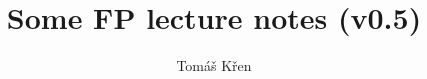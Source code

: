 \documentclass[a4paper,oneside]{memoir}
\title{Some FP lecture notes (v0.5)}
\author{Tomáš Křen}
\begin{document}
\theoremstyle{plain} 
\newtheorem{theorem}{Theorem} 
\newtheorem{proposition}{Proposition} 
\newtheorem{lemma}{Lemma} 
\newtheorem{preLemma}{Pre-Lemma} 
\newtheorem*{corollary}{Corollary}

\theoremstyle{definition} 
\newtheorem*{definition}{Definition} 
\newtheorem*{preDefinition}{Pre-Definition} 
\newtheorem{conjecture}{Conjecture}
\newtheorem*{example}{Example} 

\theoremstyle{remark} 
\newtheorem*{remark}{Remark} 
\newtheorem*{note}{Note} 
\newtheorem{case}{Case}

\frontmatter
\mainmatter
\maketitle


\tableofcontents*

\newcommand{\red}[1]{{\color{red} #1}}



\newcommand{\sigmaPr}{\sigma^\prime}
\newcommand{\tauPr}{\tau^\prime}
\newcommand{\xPr}{x^\prime}
\newcommand{\nPr}{n^\prime}
\newcommand{\nPrr}{n^{\prime\prime}}
\newcommand{\nPrrr}{n^{\prime\prime\prime}}
\newcommand{\tausPr}{\tau_s^\prime}
\newcommand{\s}{\sigma}
\newcommand{\Th}{\theta}
\newcommand{\sPr}{\sigmaPr}
\newcommand{\thPr}{\theta^\prime}



\newcommand{\then}{\Rightarrow}
\newcommand{\E}[2]{(\exists #1)\ #2}
\newcommand{\A}[2]{(\forall #1)\ #2}
\newcommand{\Ain}[3]{(\forall #1 \in #2)\ #3}


\newcommand{\op}{\operatorname}

\newcommand{\ar}{\rightarrow}
\newcommand{\ap}[2]{(#1\,#2)}
\newcommand{\defi}{\coloneqq}
\newcommand{\defe}{\mathrel{\vcentcolon\equiv}}

\newcommand{\unaRule}[2]{\dfrac{#1}{#2}}
\newcommand{\binRule}[3]{\dfrac{#1 ~ ~ ~ ~ ~ ~ ~ #2}{#3}}
\newcommand{\triRule}[4]{\dfrac{#1 ~ ~ ~ ~ ~ ~ ~ #2 ~ ~ ~ ~ ~ ~ ~ #3}{#4}}
\newcommand{\isSub}[1]{#1\ \mathit{substitution}}
\newcommand{\MGU}[2]{\op{MGU}(#1,#2)}
\newcommand{\mgu}[1]{\op{MGU}(#1)}

\newcommand{\AX}{\textit{AX}\xspace}
\newcommand{\subAx}{\textit{SUB-AX}\xspace}
\newcommand{\mguMp}{\textit{MGU-MP}\xspace}
\newcommand{\abs}[1]{\lvert #1 \rvert}

\newcommand{\Pseudokod}[4]{
	\begin{figure}[!t]
	\removelatexerror
	\begin{algorithm}[H]
		\caption{\label{#4}#1}
		\DontPrintSemicolon
		\SetKwProg{Fn}{function}{}{}
		\Fn{#2}{#3}
	\end{algorithm}
	\end{figure}
}
\end{document}
